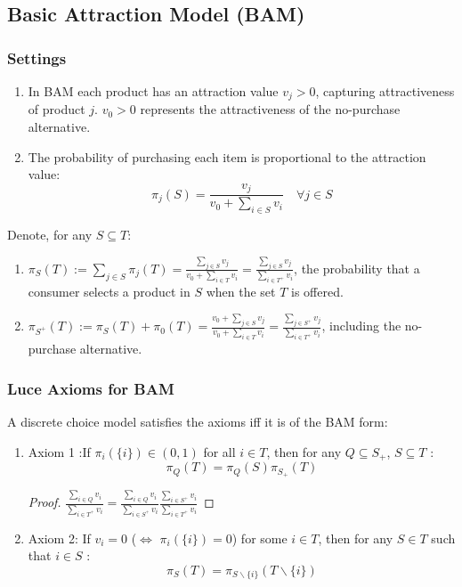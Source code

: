 \documentclass[11pt,a4paper]{article}
\begin{document}
\subsection{Basic Attraction Model (BAM)}
\subsubsection{Settings}
\begin{enumerate}[$\bullet$]
    \item In BAM each product has an attraction value $v_j > 0$, capturing attractiveness of product $j$. $v_0>0$ represents the attractiveness of the no-purchase alternative.
    \item The probability of purchasing each item is proportional to the attraction value: $$\pi_j(S)=\frac{v_j}{v_0+\sum_{i\in S}v_i}\quad \forall j\in S$$
\end{enumerate}
Denote, for any $S \subseteq T$:
\begin{enumerate}[$\bullet$]
    \item $\pi_{S}(T):=\sum_{j \in S} \pi_{j}(T)=\frac{\sum_{j \in S}v_j}{v_0+\sum_{i\in T}v_i}=\frac{\sum_{j \in S}v_j}{\sum_{i\in T^+}v_i}$, the probability that a consumer selects a product in $S$ when the set $T$ is offered.
    \item $\pi_{S^{+}}(T):=\pi_{S}(T)+\pi_{0}(T)=\frac{v_0+\sum_{j \in S}v_j}{v_0+\sum_{i\in T}v_i}=\frac{\sum_{j \in S^+}v_j}{\sum_{i\in T^+}v_i}$, including the no-purchase alternative.
\end{enumerate}
\subsubsection{Luce Axioms for BAM}
A discrete choice model satisfies the axioms iff it is of the BAM form:
\begin{enumerate}[$\bullet$]
    \item Axiom 1 :If $\pi_{i}(\{i\}) \in(0,1)$ for all $i \in T$, then for any $Q \subseteq S_{+}$, $S \subseteq T$ :
    $$
    \pi_{Q}(T)=\pi_{Q}(S) \pi_{S_{+}}(T)
    $$
    \begin{proof}
    $\frac{\sum_{i \in Q}v_i}{\sum_{i\in T^+}v_i}=\frac{\sum_{i \in Q}v_i}{\sum_{i\in S^+}v_i}\frac{\sum_{i \in S^+}v_i}{\sum_{i\in T^+}v_i}$
    \end{proof}
    \item Axiom 2: If $v_i=0$ ($\Leftrightarrow$ $\pi_{i}(\{i\})=0$) for some $i \in T$, then for any $S \in T$ such that $i \in S$ :
    $$
    \pi_{S}(T)=\pi_{S \backslash\{i\}}(T \backslash\{i\})
    $$
\end{enumerate}
\end{document}
